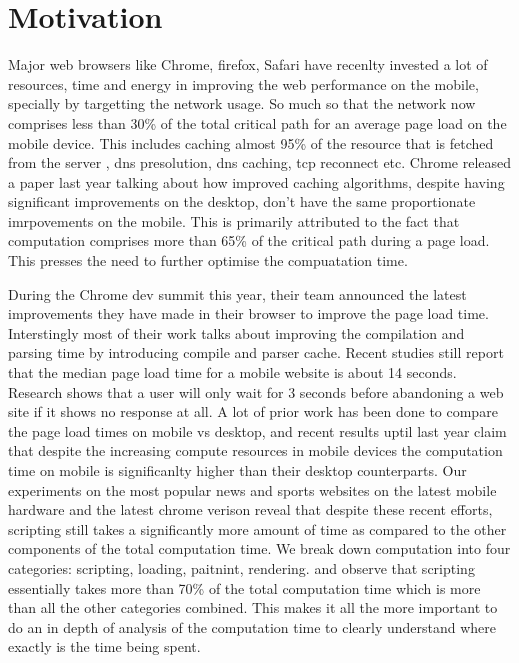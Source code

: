 \section{Motivation}
\label{sec:motivation}


Major web browsers like Chrome, firefox, Safari have recenlty invested a lot of resources,
time and energy in improving the web performance on the mobile, specially by targetting 
the network usage. So much so that the network now comprises less than 30\% \cite{} of the total critical
path for an average page load on the mobile device. This includes caching almost 95\% of the
resource that is fetched from the server \cite{}, dns presolution, dns caching, tcp reconnect etc.
Chrome released a paper last year talking about how improved caching algorithms, despite having 
significant improvements on the desktop, don't have the same proportionate imrpovements 
on the mobile. This is primarily attributed to the fact that computation comprises more than 65\%
of the critical path during a page load. This presses the need to further optimise the compuatation 
time. 

During the Chrome dev summit this year, their team announced the latest improvements they have 
made in their browser to improve the page load time. Interstingly most of their work talks about
improving the compilation and parsing time by introducing compile and parser cache. 
Recent studies \cite{} still report that the median page load time for a mobile website 
is about 14 seconds. Research \cite{} shows that a user will only wait for 3 seconds 
before abandoning a web site if it shows no response at all. A lot of prior work \cite {}
has been done to compare the page load times on mobile vs desktop, and recent results
uptil last year claim that despite the increasing compute resources in mobile devices 
the computation time on mobile is significanlty higher than their desktop counterparts. 
 Our experiments
on the most popular news and sports websites on the latest mobile hardware and the latest 
chrome verison reveal that despite these recent efforts, scripting still takes a significantly more
amount of time as compared to the other components of the total computation time. We break down computation
into four categories: scripting, loading, paitnint, rendering.
and observe that scripting essentially takes more than 70\% of the total
computation time which is more than all the other categories combined. 
This makes it all the more important to do an in depth of analysis of the computation time to clearly
understand where exactly is the time being spent. 
